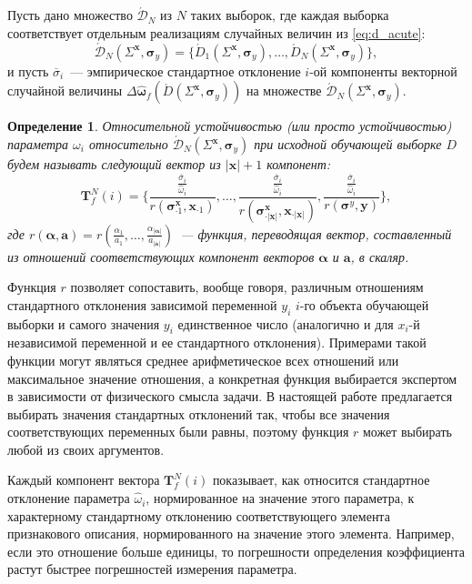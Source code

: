 \documentclass[12pt,a4paper]{article}
\newtheorem{defin}{Определение}
\begin{document}
Пусть дано множество $\acute{\mathcal{D}}_N$ из $N$ таких выборок, где каждая выборка
соответствует отдельным реализациям случайных величин из \eqref{eq:d_acute}:
\[
  \acute{\mathcal{D}}_N (\Sigma^{\mathbf{x}}, \boldsymbol{\sigma}_y) = \{ \acute{D}_1 (\Sigma^{\mathbf{x}}, \boldsymbol{\sigma}_y), \dots, \acute{D}_N (\Sigma^{\mathbf{x}}, \boldsymbol{\sigma}_y) \},
\]
и пусть $\overline{\sigma}_i$~--- эмпирическое стандартное отклонение $i$-ой компоненты
векторной случайной величины
$\Delta\hat{\boldsymbol{\omega}}_f(\acute{D} (\Sigma^{\mathbf{x}}, \boldsymbol{\sigma}_y) )$
на множестве $\acute{\mathcal{D}}_N (\Sigma^{\mathbf{x}}, \boldsymbol{\sigma}_y)$.
\begin{defin}
\emph{Относительной устойчивостью} (или просто \emph{устойчивостью}) параметра
$\omega_i$ относительно $\acute{\mathcal{D}}_N (\Sigma^{\mathbf{x}}, \boldsymbol{\sigma}_y)$
при исходной обучающей выборке $D$ будем называть следующий вектор
из $| \mathbf{x} | + 1$ компонент:
\begin{equation}
  \mathbf{T}^N_f(i) = \Big\{ \frac{\frac{\overline{\sigma}_i}{\hat{\omega}_i}}{r(\boldsymbol{\sigma}^\mathbf{x}_{\cdot 1}, \mathbf{x}_{\cdot 1})}, \dots, \frac{\frac{\overline{\sigma}_i}{\hat{\omega}_i}}{r(\boldsymbol{\sigma}^\mathbf{x}_{\cdot |\mathbf{x}|}, \mathbf{x}_{\cdot |\mathbf{x}|})}, \frac{\frac{\overline{\sigma}_i}{\hat{\omega}_i}}{r(\boldsymbol{\sigma}^y, \mathbf{y})} \Big\},
  \label{eq:t_rel}
\end{equation}
где $r(\boldsymbol{\alpha}, \mathbf{a}) = r(\frac{\alpha_1}{a_1}, \dots, \frac{\alpha_{|\boldsymbol{\alpha}|}}{a_{|\mathbf{a}|}})$~---
функция, переводящая вектор, составленный из отношений соответствующих компонент векторов $\boldsymbol{\alpha}$ и $\mathbf{a}$, в скаляр.
\end{defin}

Функция $r$ позволяет сопоставить, вообще говоря, различным отношениям стандартного
отклонения зависимой переменной $y_i$ $i$-го объекта обучающей выборки и самого значения $y_i$
единственное число (аналогично и для $x_i$-й независимой переменной и ее стандартного отклонения).
Примерами такой функции могут являться среднее арифметическое
всех отношений или максимальное значение отношения, а конкретная функция выбирается
экспертом в зависимости от физического смысла задачи.
В настоящей работе предлагается выбирать значения стандартных отклонений так, чтобы
все значения соответствующих переменных были равны, поэтому функция $r$ может выбирать
любой из своих аргументов.

Каждый компонент вектора $\mathbf{T}^N_f(i)$ показывает, как относится стандартное отклонение
параметра $\hat{\omega}_i$, нормированное на значение этого параметра, к характерному стандартному
отклонению соответствующего элемента признакового описания, нормированного на значение этого
элемента. Например, если это отношение больше единицы, то погрешности определения коэффициента
растут быстрее погрешностей измерения параметра.
\end{document}
